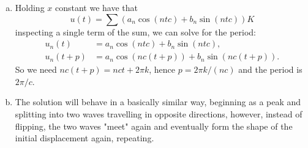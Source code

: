 \documentclass{article}
\begin{document}
\begin{enumerate}[(a)]
\begin{align*}
      f(x) &= u(0,x) = \sum \big(A_n \cos(nx) + B_n \sin(nx)\big), \\
      g(x) &= u_t(0,x) = \sum \big(C_n \cos(nx) + D_n \sin(nx)\big).
    \end{align*}
    Using the Fourier series of $f(x)$ and $g(x)$ on $[-\pi,\pi]$,
    \begin{align*}
      f(x) &= \frac{A_0}{2} + \sum_{n=1}^\infty
      \left(A_n\cos(nx)+B_n\sin(nx)\right), \\
      g(x) &= \frac{C_0}{2} + \sum_{n=1}^\infty
      \left(C_n\cos(nx)+D_n\sin(nx)\right),
    \end{align*}
    where
    \begin{align*}
      A_n &= \frac{1}{\pi}\int_{-\pi}^{\pi} f(x)\cos(nx)\,dx,
      & B_n &= \frac{1}{\pi}\int_{-\pi}^{\pi} f(x)\sin(nx)\,dx, \\
      C_n &= \frac{1}{\pi}\int_{-\pi}^{\pi} g(x)\cos(nx)\,dx,
      & D_n &= \frac{1}{\pi}\int_{-\pi}^{\pi} g(x)\sin(nx)\,dx.
    \end{align*}
  \item Holding $x$ constant we have that
    \[
      u(t)
      = \sum (a_n\cos(ntc) + b_n\sin(ntc))K
    \]
    inspecting a single term of the sum, we can solve for the period:
    \begin{align*}
      u_n(t) &= a_n\cos(ntc) + b_n\sin(ntc), \\
      u_n(t+p) &= a_n\cos(nc(t+p)) + b_n\sin(nc(t+p)).
    \end{align*}
    So we need $nc(t+p)=nct+2\pi k$, hence $p=2\pi k/(nc)$ and the
    period is $2\pi/c$.
  \item The solution will behave in a basically similar way,
    beginning as a peak and splitting into two waves travelling in
    opposite directions, however, instead of flipping, the two waves
    "meet" again and eventually form the shape of the initial
    displacement again, repeating.
\end{enumerate}
\end{document}
